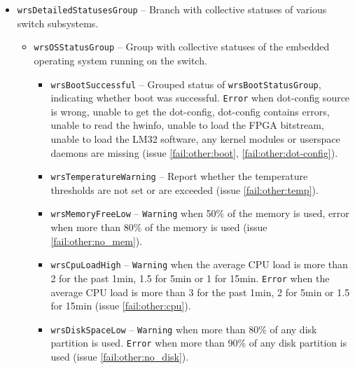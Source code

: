 \begin{itemize}
  \item \texttt{wrsDetailedStatusesGroup} -- Branch with collective statuses of
	various switch subsystems.
    \begin{itemize}
      \item \texttt{wrsOSStatusGroup} -- Group with collective statuses of the
        embedded operating system running on the switch.
      \begin{itemize}
        \item \texttt{wrsBootSuccessful} -- Grouped status of
          \texttt{wrsBootStatusGroup}, indicating whether boot was successful.
          \texttt{Error} when dot-config source is wrong, unable to get the dot-config,
          dot-config contains errors, unable to read the hwinfo, unable to load
          the FPGA bitstream, unable to load the LM32 software, any kernel
          modules or userspace daemons are missing (issue \ref{fail:other:boot},
          \ref{fail:other:dot-config}).
        \item \texttt{wrsTemperatureWarning} -- Report whether the temperature
          thresholds are not set or are exceeded (issue \ref{fail:other:temp}).
        \item \texttt{wrsMemoryFreeLow} -- \texttt{Warning} when 50\% of the memory is
          used, error when more than 80\% of the memory is used (issue
          \ref{fail:other:no_mem}).
        \item \texttt{wrsCpuLoadHigh} -- \texttt{Warning} when the average CPU load is
          more than 2 for the past 1min, 1.5 for 5min or 1 for 15min.
          \texttt{Error} when the average CPU load is more than 3 for the past
          1min, 2 for 5min or 1.5 for 15min (issue \ref{fail:other:cpu}).
        \item \texttt{wrsDiskSpaceLow} -- \texttt{Warning} when more than 80\% of any
          disk partition is used. \texttt{Error} when more than 90\% of any disk
          partition is used (issue \ref{fail:other:no_disk}).
      \end{itemize}


\end{itemize}
\end{itemize}
